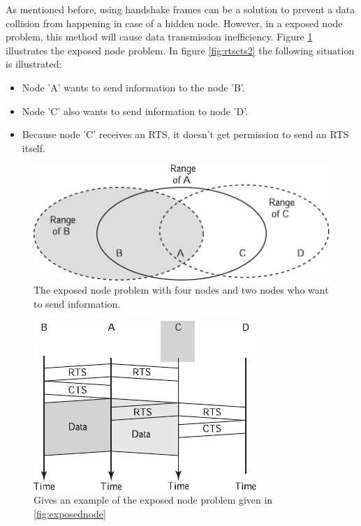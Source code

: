 \documentclass[10pt,a4paper]{article}
\begin{document}
As mentioned before, using handshake frames can be a solution to prevent a data collision from happening in case of a hidden node. However, in a exposed node problem, this method will cause data transmission inefficiency. \cite{tcipbook} Figure \ref{fig:exposedstation} illustrates the exposed node problem. In figure \ref{fig:rtscts2} the following situation is illustrated:

\begin{itemize}
\setlength\itemsep{0em}
\item Node 'A' wants to send information to the node 'B'.
\item Node 'C' also wants to send information to node 'D'.
\item Because node 'C' receives an RTS, it doesn't get permission to send an RTS itself.
\end{itemize}

\begin{figure}[H]
   \centering
   \includegraphics[width=1\textwidth]{exposedstation}
   \caption{The exposed node problem with four nodes and two nodes who want to send information.}
   \label{fig:exposedstation}
\end{figure}

\begin{figure}[H]
   \centering
   \includegraphics[width=.75\textwidth]{rtscts2}
   \caption{Gives an example of the exposed node problem given in \ref{fig:exposednode}}
   \label{fig:rtts2}
\end{figure}
\end{document}
